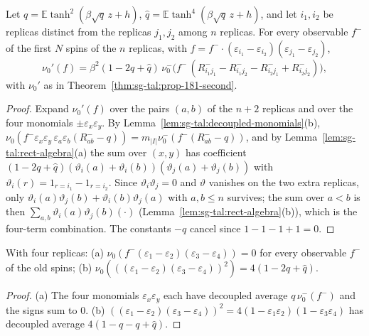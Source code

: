 \begin{theorem}
\label{thm:sg-tal:lemma-184}
  \leanok
{}
Let $q=\mathbb E\tanh^2(\beta\sqrt q\,z+h)$, $\hat q=\mathbb E\tanh^4(\beta\sqrt q\,z+h)$, and let $i_1,i_2$ be replicas distinct from the replicas $j_1,j_2$ among $n$ replicas.  For every observable $f^-$ of the first $N$ spins of the $n$ replicas, with $f=f^-\cdot(\varepsilon_{i_1}-\varepsilon_{i_2})(\varepsilon_{j_1}-\varepsilon_{j_2})$,
\[
\nu_0'(f)=\beta^2(1-2q+\hat q)\,\nu_0^-\bigl(f^-\,(R^-_{i_1j_1}-R^-_{i_1j_2}-R^-_{i_2j_1}+R^-_{i_2j_2})\bigr),
\]
with $\nu_0'$ as in Theorem~\ref{thm:sg-tal:prop-181-second}.
\end{theorem}
\begin{proof}
  \leanok
Expand $\nu_0'(f)$ over the pairs $(a,b)$ of the $n+2$ replicas and over the four monomials $\pm\varepsilon_x\varepsilon_y$.  By Lemma~\ref{lem:sg-tal:decoupled-monomials}(b), $\nu_0(f^-\varepsilon_x\varepsilon_y\,\varepsilon_a\varepsilon_b(R^-_{ab}-q))=m_{|I|}\nu_0^-(f^-(R^-_{ab}-q))$, and by Lemma~\ref{lem:sg-tal:rect-algebra}(a) the sum over $(x,y)$ has coefficient $(1-2q+\hat q)(\vartheta_i(a)+\vartheta_i(b))(\vartheta_j(a)+\vartheta_j(b))$ with $\vartheta_i(r)=1_{r=i_1}-1_{r=i_2}$.  Since $\vartheta_i\vartheta_j=0$ and $\vartheta$ vanishes on the two extra replicas, only $\vartheta_i(a)\vartheta_j(b)+\vartheta_i(b)\vartheta_j(a)$ with $a,b\le n$ survives; the sum over $a<b$ is then $\sum_{a,b}\vartheta_i(a)\vartheta_j(b)(\cdot)$ (Lemma~\ref{lem:sg-tal:rect-algebra}(b)), which is the four-term combination.  The constants $-q$ cancel since $1-1-1+1=0$.
\end{proof}

\begin{lemma}
\label{lem:sg-tal:rect-decoupled}
  \leanok
{}
With four replicas: (a) $\nu_0(f^-(\varepsilon_1-\varepsilon_2)(\varepsilon_3-\varepsilon_4))=0$ for every observable $f^-$ of the old spins; (b) $\nu_0(((\varepsilon_1-\varepsilon_2)(\varepsilon_3-\varepsilon_4))^2)=4(1-2q+\hat q)$.
\end{lemma}
\begin{proof}
  \leanok
(a) The four monomials $\varepsilon_x\varepsilon_y$ each have decoupled average $q\,\nu_0^-(f^-)$ and the signs sum to $0$.  (b) $((\varepsilon_1-\varepsilon_2)(\varepsilon_3-\varepsilon_4))^2=4(1-\varepsilon_1\varepsilon_2)(1-\varepsilon_3\varepsilon_4)$ has decoupled average $4(1-q-q+\hat q)$.
\end{proof}

